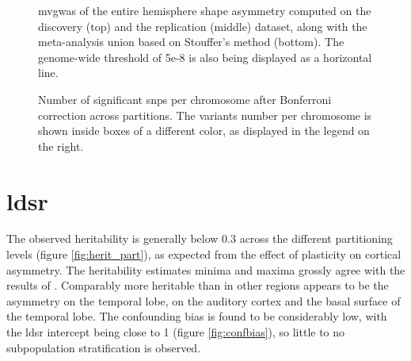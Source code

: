 \begin{figure}[H]
	\centering
	\subfloat{
		
	}
	\par\medskip
	\centering
	\subfloat{
			
	}
	\par\medskip
	\centering
	\subfloat{
			
	}
	\caption[mvGWAS of the entire hemisphere shape asymmetry]{\Ac{mvgwas} of the entire hemisphere shape asymmetry computed on the discovery (top) and the replication (middle) dataset, along with the meta-analysis union based on Stouffer's method (bottom). The genome-wide threshold of 5e-8 is also being displayed as a horizontal line.}
	\label{fig:entire_gwas}
\end{figure}


\begin{figure}[H]
	\begin{adjustwidth}{-4cm}{-3cm}
	\centering
	\subfloat{
		
	}
	\subfloat{
		
	}
	\end{adjustwidth}	
	\caption[Number of significant SNPs after Bonferroni correction along partitions]{Number of significant \acp{snp} per chromosome after Bonferroni correction across partitions. The variants number per chromosome is shown inside boxes of a different color, as displayed in the legend on the right.}
	\label{fig:part_bonferroni}
\end{figure}

\section{\acs{ldsr}}
\label{sec:ldsr_results}
The observed heritability is generally below 0.3 across the different partitioning levels (figure \autoref{fig:herit_part}), as expected from the effect of plasticity on cortical asymmetry. The heritability estimates minima and maxima grossly agree with the results of \citet{Sha2021}. Comparably more heritable than in other regions appears to be the asymmetry on the temporal lobe, on the auditory cortex and the basal surface of the temporal lobe.  The confounding bias is found to be considerably low, with the \ac{ldsr} intercept being close to 1 \cite{Bulik-Sullivan2015} (figure \autoref{fig:confbias}), so little to no subpopulation stratification is observed. 


